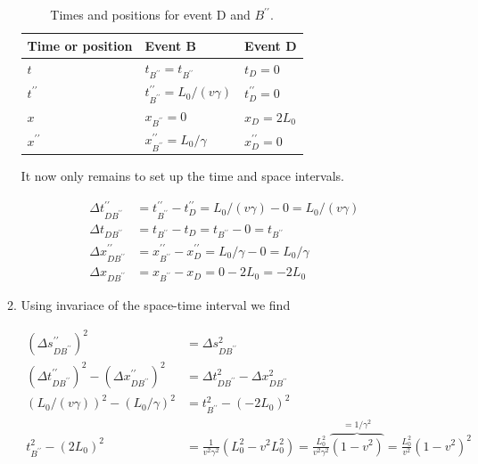 \documentclass[a4paper,10pt,english]{article}
\begin{document}
\begin{enumerate}
\begin{enumerate}
\begin{table}[H]
  \begin{center}
    \begin{tabular}{| l | l | l |}
   	\hline
	 Time or position & Event B & Event D\\ \hline
	 $t$ & $t_{B^{\prime\prime}}=t_{B^{\prime\prime}}$ & $t_{D}=0$ \\ \hline
	 $t^{\prime\prime}$ & $t^{\prime\prime}_{B^{\prime\prime}}=L_{0}/(v\gamma)$ & $t_{D}^{\prime\prime}=0$\\ \hline
	 $x$ & $x_{B^{\prime\prime}}=0$ & $x_{D}=2L_{0}$\\ \hline
	 $x^{\prime\prime}$ & $x^{\prime\prime}_{B^{\prime\prime}}=L_{0}/\gamma$ & $x_{D}^{\prime\prime}=0$\\ \hline
	\end{tabular}
    \caption{Times and positions for event D and $B^{\prime\prime}$.}
    \label{tabel:ex_2A_8_2}
  \end{center}
\end{table}
\FloatBarrier

It now only remains to set up the time and space intervals.

\begin{align*}
\Delta t^{\prime\prime}_{DB^{\prime\prime}}&=t^{\prime\prime}_{B^{\prime\prime}}-t^{\prime\prime}_{D}=L_{0}/(v\gamma)-0=L_{0}/(v\gamma)\\
\Delta t_{DB^{\prime\prime}}&=t_{B^{\prime\prime}}-t_{D}=t_{B^{\prime\prime}}-0=t_{B^{\prime\prime}}\\
\Delta x^{\prime\prime}_{DB^{\prime\prime}}&=x^{\prime\prime}_{B^{\prime\prime}}-x^{\prime\prime}_{D}=L_{0}/\gamma-0=L_{0}/\gamma\\
\Delta x_{DB^{\prime\prime}}&=x_{B^{\prime\prime}}-x_{D}=0-2L_{0}=-2L_{0}
\end{align*}

\item Using invariace of the space-time interval we find

\begin{align*}
(\Delta s^{\prime\prime}_{DB^{\prime\prime}})^{2}&=\Delta s_{DB^{\prime\prime}}^{2}\\
(\Delta t^{\prime\prime}_{DB^{\prime\prime}})^{2}-(\Delta x^{\prime\prime}_{DB^{\prime\prime}})^{2}&=\Delta t_{DB^{\prime\prime}}^{2}-\Delta x_{DB^{\prime\prime}}^{2}\\
(L_{0}/(v\gamma))^{2}-(L_{0}/\gamma)^{2}&=t_{B^{\prime\prime}}^{2}-(-2L_{0})^{2}\\
t_{B^{\prime\prime}}^{2}-(2L_{0})^{2}&=\frac{1}{v^{2}\gamma^{2}}\left(L_{0}^{2}-v^{2}L_{0}^{2}\right)=\frac{L_{0}^{2}}{v^{2}\gamma^{2}}\overbrace{(1-v^{2})}^{=1/\gamma^{2}}=\frac{L_{0}^{2}}{v^{2}}(1-v^{2})^{2}
\end{align*}


\end{enumerate}
\end{enumerate}
\end{document}
